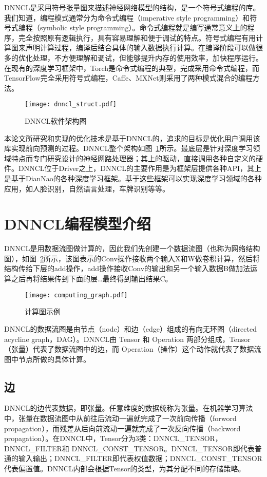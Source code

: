 DNNCL是采用符号张量图来描述神经网络模型的结构，是一个符号式编程的库。我们知道，编程模式通常分为命令式编程（imperative style programming）和符号式编程（symbolic style programming）\cite{improgram}。命令式编程就是编写通常意义上的程序，完全按照原有逻辑执行，具有容易理解和便于调试的特点。符号式编程有用计算图来声明计算过程，编译后结合具体的输入数据执行计算。在编译阶段可以做很多的优化处理，不方便理解和调试，但能够提升内存的使用效率，加快程序运行。在现有的深度学习框架中，Torch是命令式编程的典型，完成采用命令式编程，而TensorFlow完全采用符号式编程，Caffe、MXNet则采用了两种模式混合的编程方法\cite{tensorflow}。

\begin{figure}[htb]
  \centering
  \texttt{[image: dnncl\_struct.pdf]}
  \caption{DNNCL软件架构图}
  \label{fig:dnncl-struct}
\end{figure}

本论文所研究和实现的优化技术是基于DNNCL的，追求的目标是优化用户调用该库实现前向预测的过程。DNNCL整个架构如图~\ref{fig:dnncl-struct}所示。最底层是针对深度学习领域特点而专门研究设计的神经网路处理器；其上的驱动，直接调用各种自定义的硬件。DNNCL位于Driver之上，DNNCL的主要作用是为框架层提供各种API，其上是基于DianNao的各种深度学习框架。基于这些框架可以实现深度学习领域的各种应用，如人脸识别，自然语言处理，车牌识别等等。



\section{DNNCL编程模型介绍}
DNNCL是用数据流图做计算的，因此我们先创建一个数据流图（也称为网络结构图），如图~\ref{fig:cumputing-graph}所示，该图表示的Conv操作接收两个输入X和W做卷积计算，然后将结构传给下层的add操作，add操作接收Conv的输出和另一个输入数据B做加法运算之后再将结果传到下面的层…最终得到输出结果C。

\begin{figure}[htb]
  \centering
  \texttt{[image: computing\_graph.pdf]}
  \caption{计算图示例}
  \label{fig:cumputing-graph}
\end{figure}

DNNCL的数据流图是由节点（node）和边（edge）组成的有向无环图（directed acycline graph，DAG）。DNNCL由 Tensor 和 Operation 两部分组成，Tensor（张量）代表了数据流图中的边，而 Operation（操作）这个动作就代表了数据流图中节点所做的具体计算。

\subsection {边}
DNNCL的边代表数据，即张量。任意维度的数据统称为张量。在机器学习算法中，张量在数据流图中从前往后流动一遍就完成了一次前向传播（forword propagation），而残差从后向前流动一遍就完成了一次反向传播（backword propagation）。在DNNCL中，Tensor分为3类：DNNCL\_TENSOR，DNNCL\_FILTER和 DNNCL\_CONST\_TENSOR。DNNCL\_TENSOR即代表普通的输入输出；DNNCL\_FILTER即代表权值数据；DNNCL\_CONST\_TENSOR代表偏置值。DNNCL内部会根据Tensor的类型，为其分配不同的存储策略。

